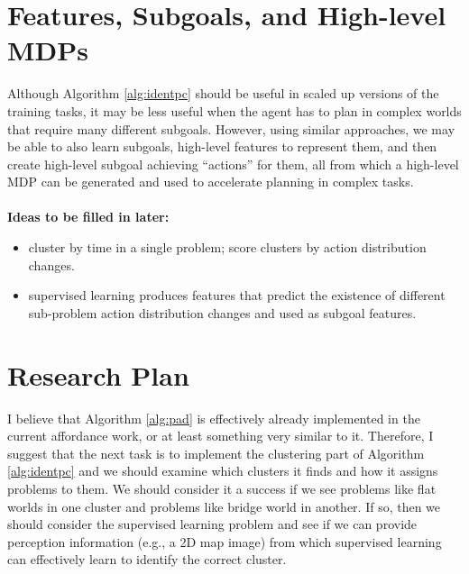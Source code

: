 \documentclass{article}
\begin{document}
\section{Features, Subgoals, and High-level MDPs}
Although Algorithm \ref{alg:identpc} should be useful in scaled up versions
of the training tasks, it may be less useful when the agent has to plan in complex
worlds that require many different subgoals. However, using similar approaches, we may be able to also learn subgoals, high-level features to represent them, and then create high-level subgoal achieving ``actions'' for them, all from which a high-level MDP can be generated and used to accelerate planning in complex tasks.
\\ 
\\
{\bf Ideas to be filled in later:}
\begin{itemize}
\item cluster by time in a single problem; score clusters by action distribution changes.
\item supervised learning produces features that predict the existence of different sub-problem action distribution changes and used as subgoal features.
\end{itemize}

\section{Research Plan}
I believe that Algorithm \ref{alg:pad} is effectively already implemented in the current affordance work, or at least something very similar to it. Therefore, I suggest that the next task is to implement the clustering part of Algorithm \ref{alg:identpc} and we should examine which clusters it finds and how it assigns problems to them. We should consider it a success if we see problems like flat worlds in one cluster and problems like bridge world in another. If so, then we should consider the supervised learning problem and see if we can provide perception information (e.g., a 2D map image) from which supervised learning can effectively learn to identify the correct cluster.
\end{document}
